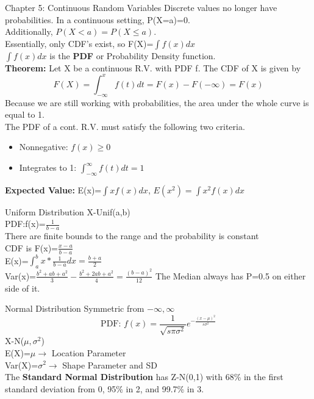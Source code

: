 \documentclass[a4paper, 12pt]{article}
\begin{document}
\begin{section}{Chapter 5: Continuous Random Variables}
Discrete values no longer have probabilities. In a continuous setting, P(X=a)=0. \\
Additionally, $P(X<a)=P(X\leq a)$. \\
Essentially, only CDF's exist, so F(X)=$\int f(x)dx$\\
$\int f(x)dx$ is the \textbf{PDF} or Probability Density function.\\
\textbf{Theorem:} Let X be a continuous R.V. with PDF f. The CDF of X is given by 
\begin{equation} 
F(X)=\int_{-\infty}^{x}f(t)dt=F(x)-F(-\infty)=F(x)
\end{equation}
Because we are still working with probabilities, the area under the whole curve is equal to 1.\\
The PDF of a cont. R.V. must satisfy the following two criteria.
\begin{itemize}
\item{Nonnegative: $f(x)\geq 0$}
\item{Integrates to 1: $\int_{-\infty}^{\infty}f(t)dt=1$}
\end{itemize}
\textbf{Expected Value:} E(x)=$\int xf(x)dx$, $E(x^{2})=\int x^{2}f(x)dx$
\begin{subsection}{Uniform Distribution}
X-Unif(a,b)\\
PDF:f(x)=$\frac{1}{b-a}$\\
There are finite bounds to the range and the probability is constant\\
CDF is F(x)=$\frac{x-a}{b-a}$\\
E(x)=$\int_{a}^{b}x*\frac{1}{b-a}dx=\frac{b+a}{2}$\\
Var(x)=$\frac{b^{2}+ab+a^{2}}{3}-\frac{b^{2}+2ab+a^{2}}{4}=\frac{(b-a)^{2}}{12}$
The Median always has P=0.5 on either side of it.
\end{subsection}
\begin{subsection}{Normal Distribution}
Symmetric from $-\infty,\infty$\\
\begin{equation} 
\mbox{PDF:  } f(x)=\frac{1}{\sqrt{s\pi\sigma^{2}}}e^{-\frac{(x-\mu)^{2}}{s\sigma^{2}}}
\end{equation}
X-N($\mu,\sigma^{2}$)\\
E(X)=$\mu\to$ Location Parameter\\
Var(X)=$\sigma^{2}\to$ Shape Parameter and SD\\
The \textbf{Standard Normal Distribution} has Z-N(0,1) with 68\% in the first standard deviation from 0, 95\% in 2, and 99.7\% in 3.

\end{subsection}
\end{section}
\end{document}
